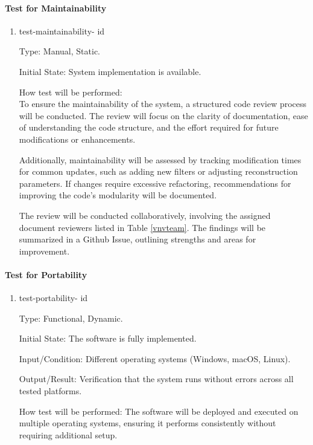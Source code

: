 \documentclass[12pt, titlepage]{article}
\newcounter{testnum}
\newcommand{\dthetestnum}{id\thetestnum}
\begin{document}
\paragraph{Test for Maintainability}

\begin{enumerate}

\item{test-maintainability- \label{id9} \dthetestnum\\}

Type: Manual, Static.

Initial State: System implementation is available.

How test will be performed:\\
To ensure the maintainability of the system, a structured code review process
will be conducted. The review will focus on the clarity of documentation, ease of
understanding the code structure, and the effort required for future
modifications or enhancements.

Additionally, maintainability will be assessed by tracking modification times
for common updates, such as adding new filters or adjusting reconstruction
parameters. If changes require excessive refactoring, recommendations for
improving the code's modularity will be documented.

The review will be conducted collaboratively, involving the assigned document
reviewers listed in Table \ref{vnvteam}. The findings will be summarized in a
Github Issue, outlining strengths and areas for improvement.
\end{enumerate}

\paragraph{Test for Portability}

\begin{enumerate}

\item{test-portability- \label{id10} \dthetestnum\\}

Type: Functional, Dynamic.

Initial State: The software is fully implemented.

Input/Condition: Different operating systems (Windows, macOS, Linux).

Output/Result: Verification that the system runs without errors across all tested platforms.

How test will be performed: The software will be deployed and executed on
multiple operating systems, ensuring it performs consistently without requiring
additional setup.
\end{enumerate}
\end{document}
